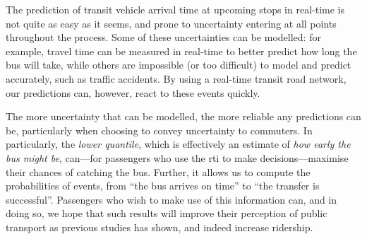 The prediction of transit vehicle arrival time at upcoming stops in real-time is not quite as easy as it seems, and prone to uncertainty entering at all points throughout the process. Some of these uncertainties can be modelled: for example, travel time can be measured in real-time to better predict how long the bus will take, while others are impossible (or too difficult) to model and predict accurately, such as traffic accidents. By using a real-time transit road network, our predictions can, however, react to these events quickly.


The more uncertainty that can be modelled, the more reliable any predictions can be, particularly when choosing to convey uncertainty to commuters. In particularly, the \emph{lower quantile}, which is effectively an estimate of \emph{how early the bus might be}, can---for passengers who use the \gls{rti} to make decisions---maximise their chances of catching the bus. Further, it allows us to compute the probabilities of events, from ``the bus arrives on time'' to ``the transfer is successful''. Passengers who wish to make use of this information can, and in doing so, we hope that such results will improve their perception of public transport as previous studies has shown, and indeed increase ridership.

